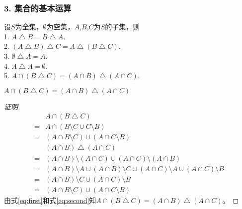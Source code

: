 \documentclass{beamer}
\begin{document}
\begin{CJK*}{UTF8}{gbsn}
\begin{frame}
  \frametitle{3. 集合的基本运算}
  \begin{Thm}
设$S$为全集，$\emptyset$为空集，$A$,$B$,$C$为$S$的子集，则\\
1. $A \bigtriangleup B = B \bigtriangleup A$.\\
2. $(A \bigtriangleup B) \bigtriangleup C = A \bigtriangleup (B \bigtriangleup C)$.\\
3. $\emptyset \bigtriangleup A = A$.\\
4. $A \bigtriangleup A = \emptyset$.\\
5. $A \cap (B \bigtriangleup C) = (A \cap B) \bigtriangleup (A \cap C)$.\\ 
  \end{Thm}
\end{frame}
\begin{frame}
  $A \cap (B \bigtriangleup C) = (A \cap B) \bigtriangleup (A \cap C)$
 \pause \begin{proof}[证明]
    \begin{align}
     &A\cap (B\bigtriangleup C)\nonumber \\
     =&A\cap (B\setminus C \cup C\setminus B) \nonumber \\
     =&(A\cap B\setminus C) \cup (A \cap C\setminus B) \label{eq:first} \\      
     &(A\cap B)\bigtriangleup (A\cap C) \nonumber \\
     =&(A\cap B)\setminus (A\cap C) \cup (A\cap C)\setminus (A\cap B) \nonumber \\
     =&(A\cap B)\setminus A \cup (A\cap B)\setminus C \cup (A\cap C)\setminus A \cup (A\cap C)\setminus B \nonumber \\
     =&(A\cap B)\setminus C \cup (A\cap C)\setminus B \nonumber \\
     =&(A\cap B\setminus C) \cup (A \cap C\setminus B)\label{eq:second}      
    \end{align}
 由式\eqref{eq:first}和式\eqref{eq:second}知$A\cap (B\bigtriangleup C)=(A\cap B)\bigtriangleup (A\cap C)$。
 \end{proof}
\end{frame}


\end{CJK*}
\end{document}
